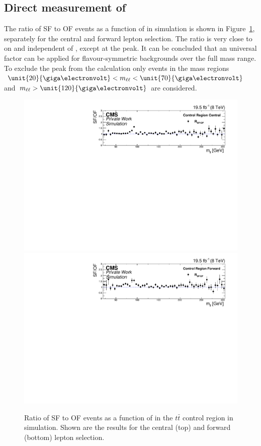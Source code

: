 \subsection{Direct measurement of \Rsfof}
The ratio of SF to OF events as a function of \mll in simulation is shown in Figure~\ref{fig:controlRatioMC}, separately for the central and forward lepton selection. The ratio is very close to on and independent of \mll, except at the \Z peak. It can be concluded that an universal factor can be applied for flavour-symmetric backgrounds over the full mass range. To exclude the \Z peak from the calculation only events in the mass regions $\unit{20}{\giga\electronvolt}< \mll < \unit{70}{\giga\electronvolt}$ and $\mll > \unit{120}{\giga\electronvolt}$ are considered.   	
\begin{figure}
\begin{center}
\includegraphics[scale=0.4]{plots/BG/control/rSFOF_ControlCentral_Full2012_Mll_None_MC.pdf}\\
\includegraphics[scale=0.4]{plots/BG/control/rSFOF_ControlForward_Full2012_Mll_None_MC.pdf}
\caption{Ratio of SF to OF events as a function of \mll in the $t\bar{t}$ control region in simulation. Shown are the results for the central (top) and forward (bottom) lepton selection.}
\label{fig:controlRatioMC}
\end{center}
\end{figure}

